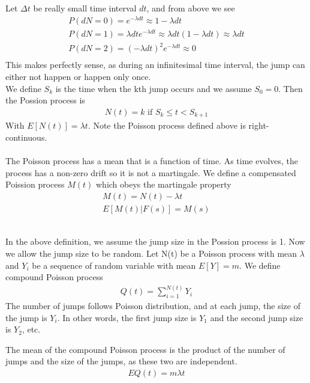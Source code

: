 \documentclass[a4paper]{article}
\begin{document}
Let $\Delta t$ be really small time interval $dt$, and from above we see
\begin{align*}
	P(dN = 0) = e^{-\lambda dt} \approx 1 - \lambda dt \\
	P(dN = 1) = \lambda dt e^{-\lambda dt} \approx \lambda dt (1 - \lambda dt) \approx \lambda dt \\
	P(dN = 2) = (-\lambda dt)^2 e^{- \lambda dt} \approx 0 \\
\end{align*}
This makes perfectly sense, as during an infinitesimal time interval, the jump can either not happen or happen only once.\\

We define $S_k$ is the time when the kth jump occurs and we assume $S_0 = 0$. Then the Possion process is
\begin{align*}
	N(t) = k  \text{ if } S_k \leq t < S_{k+1}
\end{align*}
With $E[N(t)] = \lambda t$.
Note the Poisson process defined above is right-continuous.\\

\\
The Poisson process has a mean that is a function of time. As time evolves, the process has a non-zero drift so it is not a martingale. We define a compensated Poission process $M(t)$ which obeys the martingale property
\begin{align*}
	M(t) = N(t) - \lambda t \\
	E[M(t)|F(s)] = M(s)
\end{align*}

\\
In the above definition, we assume the jump size in the Possion process is 1. Now we allow the jump size to be random. Let N(t) be a Poisson process with mean $\lambda$ and $Y_i$ be a sequence of random variable with mean $E[Y] = m$. We define compound Poisson process
\begin{align*}
	Q(t) = \sum_{i=1}^{N(t)} Y_i
\end{align*}
The number of jumps follows Poisson distribution, and at each jump, the size of the jump is $Y_i$. In other words, the first jump size is $Y_1$ and the second jump size is $Y_2$, etc.

The mean of the compound Poisson process is the product of the number of jumps and the size of the jumps, as these two are independent.
\begin{align*}
	EQ(t) = m \lambda t
\end{align*}
\end{document}
